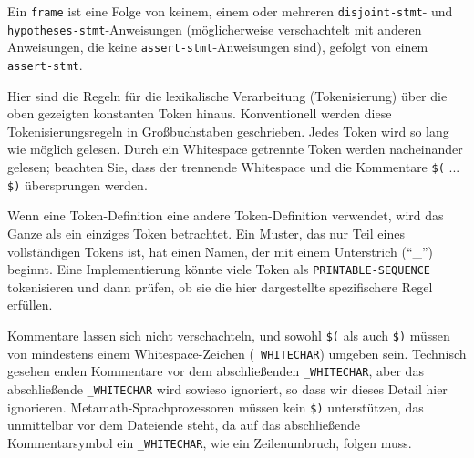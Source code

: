 Ein \texttt{frame} ist eine Folge von keinem, einem oder mehreren \texttt{disjoint-{\allowbreak}stmt}- und \texttt{hypothe\-ses-{\allowbreak}stmt}-Anweisungen (möglicherweise verschachtelt mit anderen Anweisungen, die keine \texttt{assert-stmt}-Anweisungen sind), gefolgt von einem \texttt{assert-stmt}.

Hier sind die Regeln für die lexikalische Verarbeitung (Tokenisierung) über die oben gezeigten konstanten Token hinaus. Konventionell werden diese Tokenisierungsregeln in Großbuchstaben geschrieben. Jedes Token wird so lang wie möglich gelesen. Durch ein Whitespace getrennte Token werden nacheinander gelesen; beachten Sie, dass der trennende Whitespace und die Kommentare \texttt{\$(} ... \texttt{\$)} übersprungen werden.

Wenn eine Token-Definition eine andere Token-Definition verwendet, wird das Ganze als ein einziges Token betrachtet. Ein Muster, das nur Teil eines vollständigen Tokens ist, hat einen Namen, der mit einem Unterstrich ("`\_"') beginnt. Eine Implementierung könnte viele Token als \texttt{PRINTABLE-SEQUENCE} tokenisieren und dann prüfen, ob sie die hier dargestellte spezifischere Regel erfüllen.

Kommentare lassen sich nicht verschachteln, und sowohl \texttt{\$(} als auch \texttt{\$)} müssen von mindestens einem Whitespace-Zeichen (\texttt{\_WHITECHAR}) umgeben sein. Technisch gesehen enden Kommentare vor dem abschließenden \texttt{\_WHITECHAR}, aber das abschließende \texttt{\_WHITECHAR} wird sowieso ignoriert, so dass wir dieses Detail hier ignorieren. Metamath-Sprachprozessoren müssen kein \texttt{\$)} unterstützen, das unmittelbar vor dem Dateiende steht, da auf das abschließende Kommentarsymbol ein \texttt{\_WHITECHAR}, wie ein Zeilenumbruch, folgen muss.

